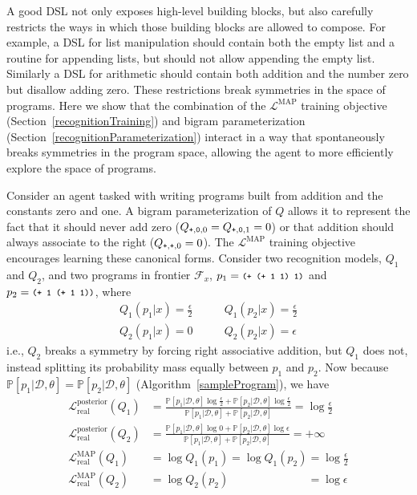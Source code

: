 \documentclass{article}
\newcommand{\code}[1]{{\footnotesize\texttt{#1}}}
\newcommand{\probability}{\mathds{P}} %
\begin{document}
A good DSL not only exposes high-level building blocks,
but also carefully restricts the ways in which those building blocks are allowed to compose.
For example,
a DSL for list manipulation should contain both the empty list and
a routine for appending lists,
but should not allow
appending the empty list.
Similarly a DSL for arithmetic should contain both addition and
the number zero but
disallow adding zero.
These restrictions break symmetries in the space of programs.
Here we show that the
combination of the $\mathcal{L}^{\text{MAP}}$ training objective (Section~\ref{recognitionTraining}) and bigram parameterization (Section~\ref{recognitionParameterization})
interact in a way that spontaneously breaks symmetries in the program space,
allowing the agent to more efficiently
explore the space of programs.

Consider an agent tasked with writing programs built from addition and the constants zero and one.
A bigram parameterization of $Q$ allows
it to represent the fact that it should never add zero ($Q_{\code{+},\code{0},0} = Q_{\code{+},\code{0},1} = 0$)
or that addition should always associate to the right
($Q_{\code{+},\code{+},0} = 0$).
The $\mathcal{L}^{\text{MAP}}$ training objective encourages
learning these canonical forms.
Consider two recognition models, $Q_1$ and $Q_2$,
and two programs in frontier $\mathcal{F}_x$,
$p_1=\code{(+ (+ 1 1) 1)}$ and $p_2=\code{(+ 1 (+ 1 1))}$,
where
\begin{align*}
  Q_1(p_1|x) = \frac{\epsilon}{2}&\qquad Q_1(p_2|x) = \frac{\epsilon}{2}\\
  Q_2(p_1|x) = 0&\qquad  Q_2(p_2|x) = \epsilon
\end{align*}
i.e., $Q_2$ breaks a symmetry by forcing right associative addition,
but $Q_1$ does not, instead splitting its probability mass equally between $p_1$ and $p_2$.
Now because $\probability[p_1|\mathcal{D},\theta] = \probability[p_2|\mathcal{D},\theta]$
(Algorithm~\ref{sampleProgram}),
we have
\begin{align*}
  \mathcal{L}^{\text{posterior}}_{\text{real}}(Q_1)& = \frac{\probability[p_1|\mathcal{D},\theta]\log \frac{\epsilon}{2} + \probability[p_2|\mathcal{D},\theta]\log \frac{\epsilon}{2}}{\probability[p_1|\mathcal{D},\theta] + \probability[p_2|\mathcal{D},\theta]} = \log \frac{\epsilon}{2}\\
  \mathcal{L}^{\text{posterior}}_{\text{real}}(Q_2)& = \frac{\probability[p_1|\mathcal{D},\theta]\log 0 + \probability[p_2|\mathcal{D},\theta]\log \epsilon}{\probability[p_1|\mathcal{D},\theta] + \probability[p_2|\mathcal{D},\theta]} = +\infty\\
  \mathcal{L}^{\text{MAP}}_{\text{real}}(Q_1)& = \log Q_1(p_1)           = \log Q_1(p_2)   = \log \frac{\epsilon}{2}\\
  \mathcal{L}^{\text{MAP}}_{\text{real}}(Q_2)& = \log Q_2(p_2) \phantom{ = \log Q_1(p_2) } = \log \epsilon\\
\end{align*}
\end{document}
